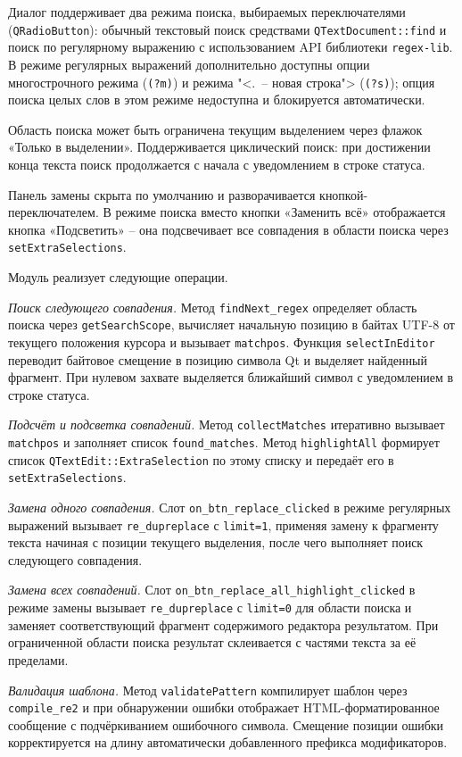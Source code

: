 Диалог поддерживает два режима поиска, выбираемых переключателями (\verb`QRadioButton`): обычный текстовый поиск средствами \verb`QTextDocument::find` и поиск по регулярному выражению с использованием API библиотеки \verb`regex-lib`. В режиме регулярных выражений дополнительно доступны опции многострочного режима (\verb`(?m)`) и режима "<\textquotedbl .\textquotedbl \ -- новая строка"> (\verb`(?s)`); опция поиска целых слов в этом режиме недоступна и блокируется автоматически.

Область поиска может быть ограничена текущим выделением через флажок «Только в выделении». Поддерживается циклический поиск: при достижении конца текста поиск продолжается с начала с уведомлением в строке статуса.

Панель замены скрыта по умолчанию и разворачивается кнопкой-переключателем. В режиме поиска вместо кнопки «Заменить всё» отображается кнопка «Подсветить» -- она подсвечивает все совпадения в области поиска через \verb`setExtraSelections`.

Модуль реализует следующие операции.

\textit{Поиск следующего совпадения.} Метод \verb`findNext_regex` определяет область поиска через \verb`getSearchScope`, вычисляет начальную позицию в байтах UTF-8 от текущего положения курсора и вызывает \verb`matchpos`. Функция \verb`selectInEditor` переводит байтовое смещение в позицию символа Qt и выделяет найденный фрагмент. При нулевом захвате выделяется ближайший символ с уведомлением в строке статуса.

\textit{Подсчёт и подсветка совпадений.} Метод \verb`collectMatches` итеративно вызывает \verb`matchpos` и заполняет список \verb`found_matches`. Метод \verb`highlightAll` формирует список \verb`QTextEdit::ExtraSelection` по этому списку и передаёт его в \verb`setExtraSelections`.

\textit{Замена одного совпадения.} Слот \verb`on_btn_replace_clicked` в режиме регулярных выражений вызывает \verb`re_dupreplace` с \verb`limit=1`, применяя замену к фрагменту текста начиная с позиции текущего выделения, после чего выполняет поиск следующего совпадения.

\textit{Замена всех совпадений.} Слот \verb`on_btn_replace_all_highlight_clicked` в режиме замены вызывает \verb`re_dupreplace` с \verb`limit=0` для области поиска и заменяет соответствующий фрагмент содержимого редактора результатом. При ограниченной области поиска результат склеивается с частями текста за её пределами.

\textit{Валидация шаблона.} Метод \verb`validatePattern` компилирует шаблон через \verb`compile_re2` и при обнаружении ошибки отображает HTML-форматированное сообщение с подчёркиванием ошибочного символа. Смещение позиции ошибки корректируется на длину автоматически добавленного префикса модификаторов.


